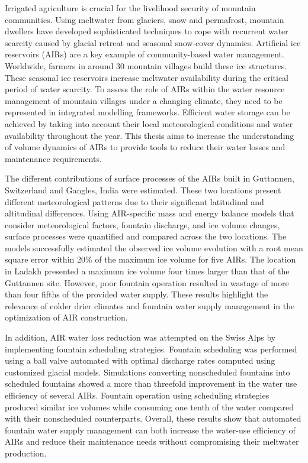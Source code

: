 \label{sec:summary}

Irrigated agriculture is crucial for the livelihood security of mountain communities. Using meltwater from
glaciers, snow and permafrost, mountain dwellers have developed sophisticated techniques to cope with recurrent
water scarcity caused by glacial retreat and seasonal snow-cover dynamics. Artificial ice reservoirs (AIRs) are
a key example of community-based water management. Worldwide, farmers in around 30 mountain villages build these
ice structures. These seasonal ice reservoirs increase meltwater availability during the critical period of
water scarcity. To assess the role of AIRs within the water resource management of mountain villages under a
changing climate, they need to be represented in integrated modelling frameworks. Efficient water storage can be
achieved by taking into account their local meteorological conditions and water availability throughout the
year. This thesis aims to increase the understanding of volume dynamics of AIRs to provide tools to reduce their
water losses and maintenance requirements.

The different contributions of surface processes of the AIRs built in Guttannen, Switzerland and  Gangles, India
were estimated. These two locations present different meteorological patterns due to their significant
latitudinal and altitudinal differences. Using AIR-specific mass and energy balance models that consider
meteorological factors, fountain discharge, and ice volume changes, surface processes were quantified and
compared across the two locations. The models successfully estimated the observed ice volume evolution with a
root mean square error within 20\% of the maximum ice volume for five AIRs. The location in Ladakh presented a
maximum ice volume four times larger than that of the Guttannen site. However, poor fountain operation resulted
in wastage of more than four fifths of the provided water supply. These results highlight the relevance of
colder drier climates and fountain water supply management in the optimization of AIR construction.

In addition, AIR water loss reduction was attempted on the Swiss Alps by implementing fountain scheduling
strategies. Fountain scheduling was performed using a ball valve automated with optimal discharge rates computed
using customized glacial models. Simulations converting nonscheduled fountains into scheduled fountains showed a
more than threefold improvement in the water use efficiency of several AIRs. Fountain operation using scheduling
strategies produced similar ice volumes while consuming one tenth of the water compared with their nonscheduled
counterparts. Overall, these results show that automated fountain water supply management can both increase the
water-use efficiency of AIRs and reduce their maintenance needs without compromising their meltwater production.

